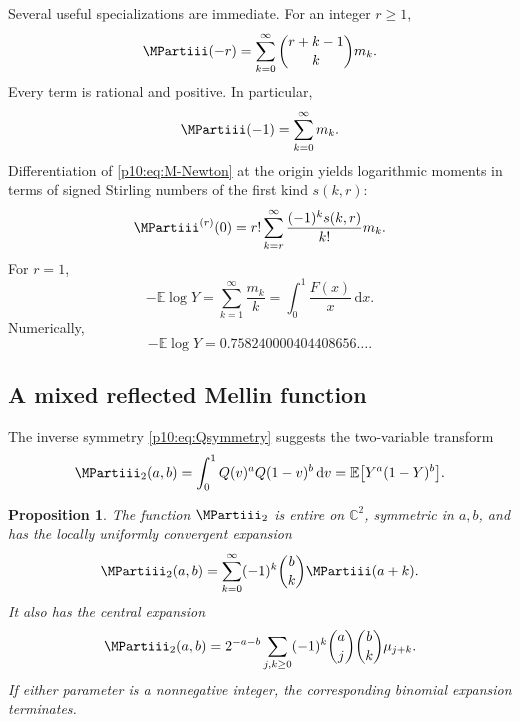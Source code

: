 \documentclass[11pt,oneside]{article}
\newtheorem{proposition}[theorem]{Proposition}
\theoremstyle{definition}
\theoremstyle{remark}
\newcommand{\F}{F}
\newcommand{\Q}{Q}
\newcommand{\E}{\mathbb E}
\newcommand{\C}{\mathbb C}
\newcommand{\dd}{\,\mathrm d}
\newcommand{\1}{\mathbf 1}
\begin{document}
Several useful specializations are immediate.  For an integer \(r\ge1\),
\begin{equation}\label{p10:eq:negative-moment-rational-series}
 \MPartiii(-r)=\sum_{k=0}^{\infty}\binom{r+k-1}{k}m_k.
\end{equation}
Every term is rational and positive.  In particular,
\begin{equation}\label{p10:eq:Mminus1-series}
 \MPartiii(-1)=\sum_{k=0}^{\infty}m_k.
\end{equation}
Differentiation of \cref{p10:eq:M-Newton} at the origin yields logarithmic moments in
terms of signed Stirling numbers of the first kind \(s(k,r)\):
\begin{equation}\label{p10:eq:log-moment-Stirling}
 \MPartiii^{(r)}(0)
 =r!\sum_{k=r}^{\infty}\frac{(-1)^ks(k,r)}{k!}m_k.
\end{equation}
For \(r=1\),
\begin{equation}\label{p10:eq:log-moment-constant}
 -\E\log Y
 =\sum_{k=1}^{\infty}\frac{m_k}{k}
 =\int_0^1\frac{\F(x)}x\dd x.
\end{equation}
Numerically,
\begin{equation}\label{p10:eq:log-moment-numeric}
 -\E\log Y=0.758240000404408656\ldots.
\end{equation}

\subsection{A mixed reflected Mellin function}

The inverse symmetry \cref{p10:eq:Qsymmetry} suggests the two-variable transform
\begin{equation}\label{p10:eq:M2def}
 \MPartiii_2(a,b)=\int_0^1\Q(v)^a\Q(1-v)^b\dd v
 =\E\bigl[Y^a(1-Y)^b\bigr].
\end{equation}

\begin{proposition}\label{p10:prop:M2}
The function \(\MPartiii_2\) is entire on \(\C^2\), symmetric in \(a,b\), and has the
locally uniformly convergent expansion
\begin{equation}\label{p10:eq:M2-series}
 \MPartiii_2(a,b)=\sum_{k=0}^{\infty}(-1)^k\binom bk\MPartiii(a+k).
\end{equation}
It also has the central expansion
\begin{equation}\label{p10:eq:M2-central}
 \MPartiii_2(a,b)=2^{-a-b}
 \sum_{j,k\ge0}(-1)^k\binom aj\binom bk\mu_{j+k}.
\end{equation}
If either parameter is a nonnegative integer, the corresponding binomial expansion
terminates.
\end{proposition}
\end{document}
